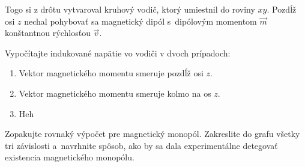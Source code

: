 Togo si z drôtu vytvaroval kruhový vodič, ktorý umiestnil do roviny $xy$.
Pozdĺž osi $z$ nechal pohybovať sa magnetický dipól s~dipólovým momentom $\vec{m}$ konštantnou rýchlosťou $\vec{v}$. 

Vypočítajte indukované napätie vo vodiči v dvoch prípadoch:
\begin{enumerate}[label=\alph*)]
	\item Vektor magnetického momentu smeruje pozdĺž osi $z$.
	\item Vektor magnetického momentu smeruje kolmo na os $z$.
	\item Heh
\end{enumerate}

Zopakujte rovnaký výpočet pre magnetický monopól.
Zakreslite do grafu všetky tri závislosti a~navrhnite spôsob,
ako by sa dala experimentálne detegovať existencia magnetického monopólu.

